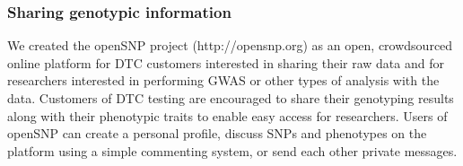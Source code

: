 \documentclass[10pt]{article}
\begin{document}
%
%
%
%

\subsubsection*{Sharing genotypic information}

We created the openSNP project (http://opensnp.org) as an open, crowdsourced online platform for DTC customers interested in sharing their raw data and for researchers interested in performing GWAS or other types of analysis with the data. 
Customers of DTC testing are encouraged to share their genotyping results along with their phenotypic traits to enable easy access for researchers.
Users of openSNP can create a personal profile, discuss SNPs and phenotypes on the platform using a simple commenting system, or send each other private messages.
\end{document}
